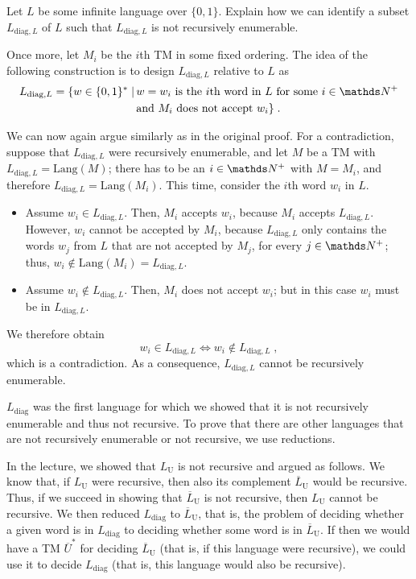 \documentclass{exercise}
\begin{document}

Let $L$ be some infinite language over $\{0,1\}$.  Explain how we can
identify a subset $L_{\text{diag},L}$ of $L$ such that $L_{\text{diag},L}$
is not recursively enumerable.

\begin{solution}
  Once more, let $M_i$ be the $i$th TM in some fixed ordering.  The idea
  of the following construction is to design $L_{\text{diag},L}$ relative
  to $L$ as
  \begin{align*}
    L_{\text{diag},L} =  \{w\in\{0,1\}^*\mid &\, w=w_i\text{ is the $i$th word in $L$ for some $i\in\nat^+$}\\
                                             &\, \text{and $M_i$ does not accept $w_i$}\}\;.
  \end{align*}

  We can now again argue similarly as in the original proof.  For a contradiction,
  suppose that $L_{\text{diag},L}$ were recursively enumerable, and let $M$ be a TM
  with $L_{\text{diag},L}=\text{Lang}(M)$; there has to be an $i\in\nat^+$ with
  $M=M_i$, and therefore $L_{\text{diag},L}=\text{Lang}(M_i)$.  This time, consider
  the $i$th word $w_i$ in $L$.
  \begin{itemize}
    \item Assume $w_i\in L_{\text{diag},L}$.  Then, $M_i$ accepts $w_i$, because
      $M_i$ accepts $L_{\text{diag},L}$.  However, $w_i$ cannot be accepted by $M_i$, because
      $L_{\text{diag},L}$ only contains the words $w_j$ from $L$ that are not accepted
      by $M_j$, for every $j\in\nat^+$; thus, $w_i\notin\text{Lang}(M_i)=L_{\text{diag},L}$.
    \item Assume $w_i\notin L_{\text{diag},L}$.  Then, $M_i$ does not
      accept $w_i$; but in this case $w_i$ must be in $L_{\text{diag},L}$.
  \end{itemize}
  We therefore obtain
  \[ w_i\in L_{\text{diag},L} \iff w_i\notin L_{\text{diag},L}\;, \]
  which is a contradiction.  As a consequence, $L_{\text{diag},L}$ cannot
  be recursively enumerable.
\end{solution}


$L_{\text{diag}}$ was the first language for which we showed that it is not recursively
enumerable and thus not recursive.  To prove that there are other
languages that are not recursively enumerable or not recursive, we use reductions.

In the lecture, we showed that $L_{\text{U}}$ is not recursive and argued as
follows.  We know that, if $L_{\text{U}}$ were recursive, then also its
complement $\overline{L}_{\text{U}}$ would be recursive.  Thus, if we succeed
in showing that $\overline{L}_{\text{U}}$ is not recursive, then $L_{\text{U}}$
cannot be recursive.  We then reduced $L_{\text{diag}}$ to
$\overline{L}_{\text{U}}$, that is, the problem of deciding whether a given
word is in $L_{\text{diag}}$ to deciding whether some word is in
$\overline{L}_{\text{U}}$.  If then we would have a TM $\overline{U}^*$ for deciding
$\overline{L}_{\text{U}}$ (that is, if this language were recursive), we could
use it to decide $L_{\text{diag}}$ (that is, this language would also be
recursive).
\end{document}
